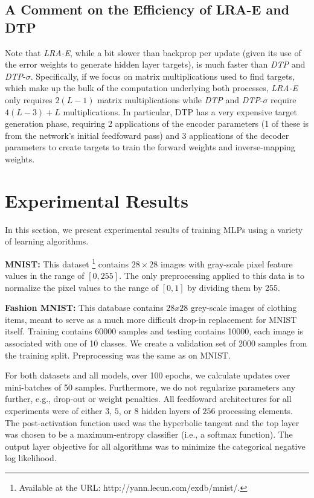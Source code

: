 \documentclass[letterpaper]{article} %
\begin{document}
\subsection{A Comment on the Efficiency of LRA-E and DTP}
Note that \emph{LRA-E}, while a bit slower than backprop per update (given its use of the error weights to generate hidden layer targets), is much faster than \emph{DTP} and \emph{DTP}-$\sigma$. Specifically, if we focus on matrix multiplications used to find targets, which make up the bulk of the computation underlying both processes, \emph{LRA-E} only requires $2 (L - 1)$ matrix multiplications while \emph{DTP} and \emph{DTP}-$\sigma$ require $4 (L-3) + L$ multiplications. In particular, DTP has a very expensive target generation phase, requiring 2 applications of the encoder parameters (1 of these is from the network's initial feedfoward pass) and 3 applications of the decoder parameters to create targets to train the forward weights and inverse-mapping weights. 

\section{Experimental Results}
\label{sec:results}
In this section, we present experimental results of training MLPs using a variety of learning algorithms.

\textbf{MNIST:} This dataset \footnote{Available at the URL:  http://yann.lecun.com/exdb/mnist/.} contains $28\times28$ images with gray-scale pixel feature values in the range of $[0,255]$. The only preprocessing applied to this data is to normalize the pixel values to the range of $[0,1]$ by dividing them by 255.

\textbf{Fashion MNIST:} This database \cite{xiao2017fashion} contains $28x28$ grey-scale images of clothing items, meant to serve as a much more difficult drop-in replacement for MNIST itself. Training contains 60000 samples and testing contains 10000, each image is associated with one of 10 classes. We create a validation set of 2000 samples from the training split. Preprocessing was the same as on MNIST.

For both datasets and all models, over 100 epochs, we calculate updates over mini-batches of 50 samples. Furthermore, we do not regularize parameters any further, e.g., drop-out \cite{srivastava2014dropout} or weight penalties.
All feedfoward architectures for all experiments were of either $3$, $5$, or $8$ hidden layers of $256$ processing elements. The post-activation function used was the hyperbolic tangent and the top layer was chosen to be a maximum-entropy classifier (i.e., a softmax function). The output layer objective for all algorithms was to minimize the categorical negative log likelihood.
\end{document}
